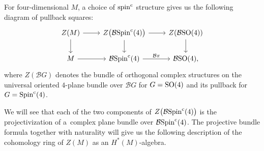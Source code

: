 \documentclass[pdftex]{sigma}%
\DeclareMathOperator{\Spin}{Spin}
\numberwithin{equation}{section}
\begin{document}
For four-dimensional $M$, a choice of ${\rm spin}^{\rm c}$ structure gives us the following diagram of pullback squares:
\[
\begin{tikzcd}
Z(M) \ar[r] \ar[d] & Z\big({\mathcal B}{\rm Spin}^{\rm c}(4)\big) \ar[r] \ar[d] & Z({\mathcal B}{\rm SO}(4)) \ar[d] \\ M \ar[r] &
{\mathcal B}{\rm Spin}^{\rm c}(4) \ar[r,"{\mathcal B}\pi"] & {\mathcal B}{\rm SO}(4),
\end{tikzcd}
\]
where $Z({\mathcal B}G)$ denotes the bundle of orthogonal complex structures on the universal oriented $4$-plane bundle over ${\mathcal B}G$ for $G={\rm SO}(4)$ and its pullback for $G=\Spin^{\rm c}(4)$.

We will see that each of the two components of $Z\big({\mathcal B}{\rm Spin}^{\rm c}(4)\big)$ is the projectivization of a~complex plane bundle over ${\mathcal B}{\rm Spin}^{\rm c}(4)$. The projective bundle formula together with naturality will give us the following description of the cohomology ring of $Z(M)$ as an $H^*(M)$-algebra.
\end{document}
